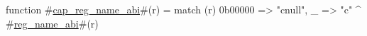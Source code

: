 function #\hyperref[sailRISCVzcapzyregzynamezyabi]{cap\_reg\_name\_abi}#(r) = {
  match (r) {
    0b00000 => "cnull",
    _       => "c" ^ #\hyperref[sailRISCVzregzynamezyabi]{reg\_name\_abi}#(r)
  }
}
